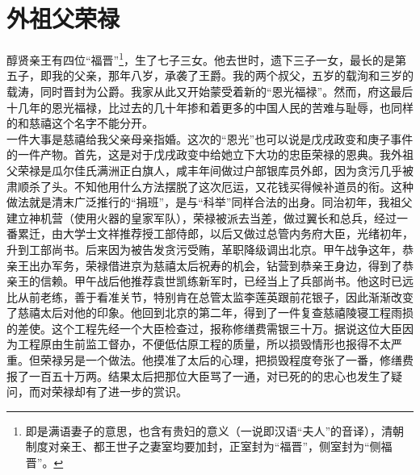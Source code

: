 \fancyhead[RO]{} %
\fancyhead[LE]{} %
\chapter*{外祖父荣禄}
\thispagestyle{empty}
醇贤亲王有四位“福晋”\footnote{即是满语妻子的意思，也含有贵妇的意义（一说即汉语“夫人”的音译），清朝制度对亲王、都王世子之妻室均要加封，正室封为“福晋”，侧室封为“侧福晋”。}，生了七子三女。他去世时，遗下三子一女，最长的是第五子，即我的父亲，那年八岁，承袭了王爵。我的两个叔父，五岁的载洵和三岁的载涛，同时晋封为公爵。我家从此又开始蒙受着新的“恩光福禄”。然而，府这最后十几年的恩光福禄，比过去的几十年掺和着更多的中国人民的苦难与耻辱，也同样的和慈禧这个名字不能分开。\\

  一件大事是慈禧给我父亲母亲指婚。这次的“恩光”也可以说是戊戌政变和庚子事件的一件产物。首先，这是对于戊戌政变中给她立下大功的忠臣荣禄的恩典。我外祖父荣禄是瓜尔佳氏满洲正白旗人，咸丰年间做过户部银库员外郎，因为贪污几乎被肃顺杀了头。不知他用什么方法摆脱了这次厄运，又花钱买得候补道员的衔。这种做法就是清末广泛推行的“捐班”，是与“科举”同样合法的出身。同治初年，我祖父建立神机营（使用火器的皇家军队），荣禄被派去当差，做过翼长和总兵，经过一番累迁，由大学士文祥推荐授工部侍郎，以后又做过总管内务府大臣，光绪初年，升到工部尚书。后来因为被告发贪污受贿，革职降级调出北京。甲午战争这年，恭亲王出办军务，荣禄借进京为慈禧太后祝寿的机会，钻营到恭亲王身边，得到了恭亲王的信赖。甲午战后他推荐袁世凯练新军时，已经当上了兵部尚书。他这时已远比从前老练，善于看准关节，特别肯在总管太监李莲英跟前花银子，因此渐渐改变了慈禧太后对他的印象。他回到北京的第二年，得到了一件复查慈禧陵寝工程雨损的差使。这个工程先经一个大臣检查过，报称修缮费需银三十万。据说这位大臣因为工程原由生前监工督办，不便低估原工程的质量，所以损毁情形也报得不太严重。但荣禄另是一个做法。他摸准了太后的心理，把损毁程度夸张了一番，修缮费报了一百五十万两。结果太后把那位大臣骂了一通，对已死的的忠心也发生了疑问，而对荣禄却有了进一步的赏识。\\

